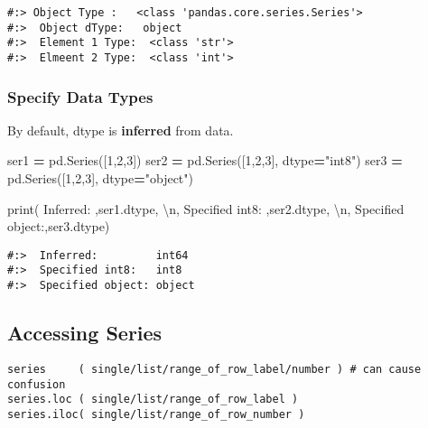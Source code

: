 \documentclass[
]{book}
\newenvironment{Shaded}{\begin{snugshade}}{\end{snugshade}}
\newcommand{\BuiltInTok}[1]{#1}
\newcommand{\CharTok}[1]{\textcolor[rgb]{0.5,0.5,0.5}{#1}}
\newcommand{\DecValTok}[1]{\textcolor[rgb]{0.06,0.06,0.06}{#1}}
\newcommand{\NormalTok}[1]{#1}
\newcommand{\OperatorTok}[1]{\textcolor[rgb]{0.43,0.43,0.43}{\textbf{#1}}}
\newcommand{\StringTok}[1]{\textcolor[rgb]{0.5,0.5,0.5}{#1}}
\begin{document}
\begin{verbatim}
#:> Object Type :   <class 'pandas.core.series.Series'> 
#:>  Object dType:   object 
#:>  Element 1 Type:  <class 'str'> 
#:>  Elmeent 2 Type:  <class 'int'>
\end{verbatim}

\hypertarget{specify-data-types}{%
\subsubsection{Specify Data Types}\label{specify-data-types}}

By default, dtype is \textbf{inferred} from data.

\begin{Shaded}
\begin{Highlighting}[]
\NormalTok{ser1 }\OperatorTok{=}\NormalTok{ pd.Series([}\DecValTok{1}\NormalTok{,}\DecValTok{2}\NormalTok{,}\DecValTok{3}\NormalTok{])}
\NormalTok{ser2 }\OperatorTok{=}\NormalTok{ pd.Series([}\DecValTok{1}\NormalTok{,}\DecValTok{2}\NormalTok{,}\DecValTok{3}\NormalTok{], dtype}\OperatorTok{=}\StringTok{"int8"}\NormalTok{)}
\NormalTok{ser3 }\OperatorTok{=}\NormalTok{ pd.Series([}\DecValTok{1}\NormalTok{,}\DecValTok{2}\NormalTok{,}\DecValTok{3}\NormalTok{], dtype}\OperatorTok{=}\StringTok{"object"}\NormalTok{)}

\BuiltInTok{print}\NormalTok{(}\StringTok{\textquotesingle{} Inferred:        \textquotesingle{}}\NormalTok{,ser1.dtype, }\StringTok{\textquotesingle{}}\CharTok{\textbackslash{}n}\StringTok{\textquotesingle{}}\NormalTok{,}
      \StringTok{\textquotesingle{}Specified int8:  \textquotesingle{}}\NormalTok{,ser2.dtype, }\StringTok{\textquotesingle{}}\CharTok{\textbackslash{}n}\StringTok{\textquotesingle{}}\NormalTok{,}
      \StringTok{\textquotesingle{}Specified object:\textquotesingle{}}\NormalTok{,ser3.dtype)}
\end{Highlighting}
\end{Shaded}

\begin{verbatim}
#:>  Inferred:         int64 
#:>  Specified int8:   int8 
#:>  Specified object: object
\end{verbatim}

\hypertarget{accessing-series}{%
\subsection{Accessing Series}\label{accessing-series}}

\begin{verbatim}
series     ( single/list/range_of_row_label/number ) # can cause confusion
series.loc ( single/list/range_of_row_label )
series.iloc( single/list/range_of_row_number )
\end{verbatim}
\end{document}
